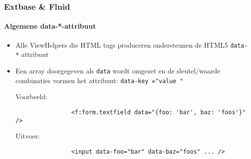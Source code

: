 \begin{frame}[fragile]
	\frametitle{Extbase \& Fluid}
	\framesubtitle{Algemene data-*-attribuut}


	\begin{itemize}
		\item Alle ViewHelpers die HTML tags produceren ondersteunen de HTML5 \texttt{data-*} attribuut
		\item Een array doorgegeven als \texttt{data} wordt omgezet en de sleutel/waarde combinaties vormen het attribuut:
			\texttt{data-\begingroup\color{typo3orange}key\endgroup
				="\begingroup\color{typo3orange}value\endgroup
				"}\newline

			Voorbeeld:
			\begin{lstlisting}
				<f:form.textfield data="{foo: 'bar', baz: 'foos'}" />
			\end{lstlisting}

			Uitvoer:
			\begin{lstlisting}
				<input data-foo="bar" data-baz="foos" ... />
			\end{lstlisting}
		
	\end{itemize}

\end{frame}


